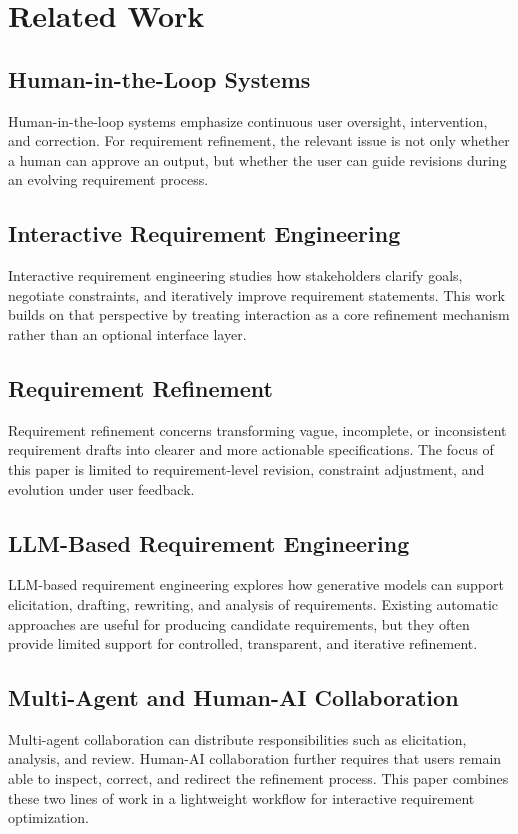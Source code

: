 \section{Related Work}
\label{related_work}

\subsection{Human-in-the-Loop Systems}
\label{subsec:rw-hitl}
Human-in-the-loop systems emphasize continuous user oversight, intervention, and correction. For requirement refinement, the relevant issue is not only whether a human can approve an output, but whether the user can guide revisions during an evolving requirement process.

\subsection{Interactive Requirement Engineering}
\label{subsec:rw-interactive-re}
Interactive requirement engineering studies how stakeholders clarify goals, negotiate constraints, and iteratively improve requirement statements. This work builds on that perspective by treating interaction as a core refinement mechanism rather than an optional interface layer.

\subsection{Requirement Refinement}
\label{subsec:rw-refinement}
Requirement refinement concerns transforming vague, incomplete, or inconsistent requirement drafts into clearer and more actionable specifications. The focus of this paper is limited to requirement-level revision, constraint adjustment, and evolution under user feedback.

\subsection{LLM-Based Requirement Engineering}
\label{subsec:rw-llm-re}
LLM-based requirement engineering explores how generative models can support elicitation, drafting, rewriting, and analysis of requirements. Existing automatic approaches are useful for producing candidate requirements, but they often provide limited support for controlled, transparent, and iterative refinement.

\subsection{Multi-Agent and Human-AI Collaboration}
\label{subsec:rw-multi-agent}
Multi-agent collaboration can distribute responsibilities such as elicitation, analysis, and review. Human-AI collaboration further requires that users remain able to inspect, correct, and redirect the refinement process. This paper combines these two lines of work in a lightweight workflow for interactive requirement optimization.

